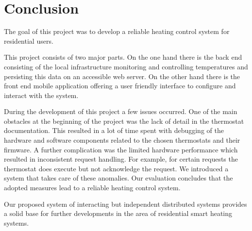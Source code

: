 
\chapter{Conclusion}
\label{sec:conclusion}


The goal of this project was to develop a reliable heating control system for residential users.

This project consists of two major parts.
On the one hand there is the back end consisting of the local infrastructure monitoring and controlling temperatures and persisting this data on an accessible web server.
On the other hand there is the front end mobile application offering a user friendly interface to configure and interact with the system.

During the development of this project a few issues occurred.
One of the main obstacles at the beginning of the project was the lack of detail in the thermostat documentation.
This resulted in a lot of time spent with debugging of the hardware and software components related to the chosen thermostats and their firmware.
A further complication was the limited hardware performance which resulted in inconsistent request handling.
For example, for certain requests the thermostat does execute but not acknowledge the request.
We introduced a system that takes care of these anomalies.
Our evaluation concludes that the adopted measures lead to a reliable heating control system.


Our proposed system of interacting but independent distributed systems provides a solid base for further developments in the area of residential smart heating systems.
